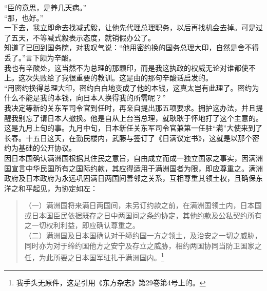 “臣的意思，是养几天病。”\\

“那，也好。”\\

一下去，我立即命去找减式毅，让他先代理总理职务，以后再找机会去掉。可是过了五天，不等减式毅表示态度，就销假办公了。\\

知道了已回到国务院，对我叹气说：“他用密约换的国务总理大印，自然是舍不得丢了。”言下颇为辛酸。\\

我也有辛酸处，这当然不为总理的那颗印，而是我这执政的权威无论对谁都使不上。这次失败给了我很重要的教训。这是由的那句辛酸话启发的。\\

“用密约换得总理大印，密约白白地变成了他的本钱，这真太岂有此理了。密约为什么不能是我的本钱，向日本人换得我的所需呢？”\\

我决定等新的关东军司令官到任时，再亲自提出那五项要求。拥护这办法，并且提醒我别忘了请日本人撤换。他是自从上台当总理，就耿耿于怀地打了这个主意的。\\

这是九月上旬的事。九月中旬，日本新任关东军司令官兼第一任驻“满”大使来到了长春。十五日这天，在勤民楼内，武藤与签订了《日满议定书》，这就是以那个密约为基础的公开协议。\\

因日本国确认满洲国根据其住民之意旨，自由成立而成一独立国家之事实，因满洲国宣言中华民国所有之国际约款，其应得适用于满洲国者为限，即应尊重之。满洲政府及日本政府为永远巩固满日两国间善邻之关系，互相尊重其领土权，且确保东洋之和平起见，为协定如左：\\

\begin{quote}
	（一）满洲国将来满日两国间，未另订约款之前，在满洲国领土内，日本国或日本国臣民依据既存之日中两国间之条约协定，其他约款及公私契约所有之一切权利利益，即应确认尊重之。\\

（二）满洲国及日本国确认对于缔约国一方之领土，及治安之一切之威胁，同时亦为对于缔约国他方之安宁及存立之威胁，相约两国协同当防卫国家之任，为此所要之日本国军驻扎于满洲国内。\footnote{我手头无原件，这是引用《东方杂志》第29卷第4号上的。}\\
\end{quote}

